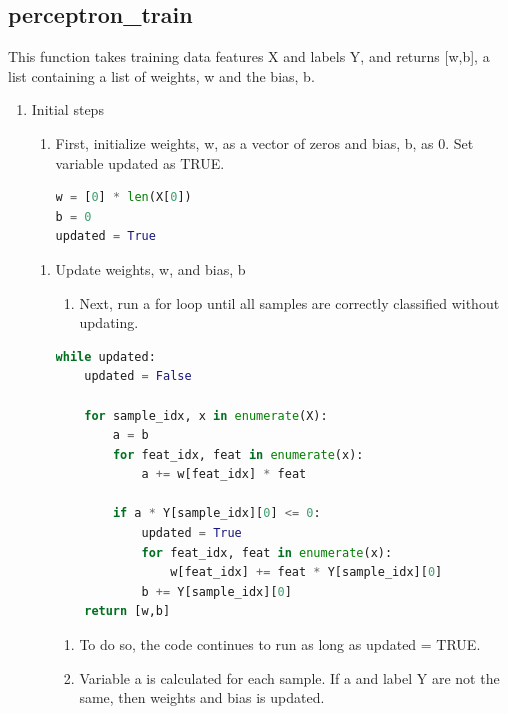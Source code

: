 \documentclass[11pt]{article}
\theoremstyle{definition}
\begin{document}
\subsection{perceptron\_train}
This function takes training data features \textsf{X} and labels \textsf{Y}, and returns \textsf{[w,b]}, a list containing a list of weights, \textsf{w} and the bias, \textsf{b}.
\begin{enumerate}
    \item Initial steps
    \begin{enumerate}
        \item First, initialize weights, \textsf{w}, as a vector of zeros and bias, \textsf{b}, as 0. Set variable \textsf{updated} as TRUE.
\begin{lstlisting}[language=python, frame=single]
w = [0] * len(X[0])
b = 0
updated = True
\end{lstlisting}
\end{enumerate}
\begin{enumerate}
    \item Update weights, \textsf{w}, and bias, \textsf{b}
    \begin{enumerate}
        \item Next, run a for loop until all samples are correctly classified without updating.
    \end{enumerate}
\begin{lstlisting}[language=python, frame=single]
while updated:
    updated = False
    
    for sample_idx, x in enumerate(X):
    	a = b
    	for feat_idx, feat in enumerate(x):
    		a += w[feat_idx] * feat
    
    	if a * Y[sample_idx][0] <= 0:
    		updated = True
    		for feat_idx, feat in enumerate(x):
    			w[feat_idx] += feat * Y[sample_idx][0]
    		b += Y[sample_idx][0]
    return [w,b]
\end{lstlisting}
        \begin{enumerate}
            \item To do so, the code continues to run as long as \textsf{updated = TRUE}.
            \item Variable \textsf{a} is calculated for each sample. If \textsf{a} and label \textsf{Y} are not the same, then weights and bias is updated.
        \end{enumerate}
    \end{enumerate}
\end{enumerate}

\clearpage
\end{document}
